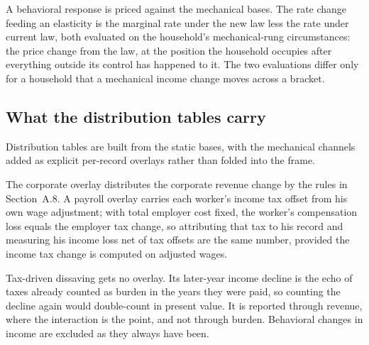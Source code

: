 \documentclass[10pt,twocolumn]{article}
\begin{document}
A behavioral response is priced against the mechanical bases. The rate change
feeding an elasticity is the marginal rate under the new law less the rate under
current law, both evaluated on the household's mechanical-rung circumstances:
the price change from the law, at the position the household occupies after
everything outside its control has happened to it. The two evaluations differ
only for a household that a mechanical income change moves across a bracket.

\subsection*{What the distribution tables carry}

Distribution tables are built from the static bases, with the mechanical
channels added as explicit per-record overlays rather than folded into the
frame.

The corporate overlay distributes the corporate revenue change by the rules in
Section~A.8. A payroll overlay carries each worker's income tax offset from his
own wage adjustment; with total employer cost fixed, the worker's compensation
loss equals the employer tax change, so attributing that tax to his record and
measuring his income loss net of tax offsets are the same number, provided the
income tax change is computed on adjusted wages.

Tax-driven dissaving gets no overlay. Its later-year income decline is the echo
of taxes already counted as burden in the years they were paid, so counting the
decline again would double-count in present value. It is reported through
revenue, where the interaction is the point, and not through burden. Behavioral
changes in income are excluded as they always have been.
\end{document}
